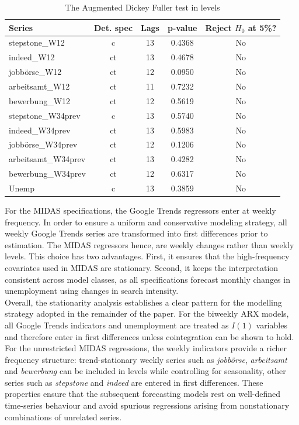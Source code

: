 \documentclass[12pt,a4paper]{article}
\begin{document}
\begin{table}
\label{tab:adf_levels}
\caption{The Augmented Dickey Fuller test in levels}
\begin{tabular}{lcccc}
\hline\hline
Series & Det. spec & Lags & p-value & Reject $H_0$ at 5\%? \\
\hline
stepstone\_W12      & c  & 13 &  0.4368 & No \\
indeed\_W12         & ct & 13 &  0.4678 & No \\
jobbörse\_W12       & ct & 12 &  0.0950 & No \\
arbeitsamt\_W12     & ct & 11 &  0.7232 & No \\
bewerbung\_W12      & ct & 12 &  0.5619 & No \\
stepstone\_W34prev  & c  & 13 &  0.5740 & No \\
indeed\_W34prev     & ct & 13 &  0.5983 & No \\
jobbörse\_W34prev   & ct & 12 &  0.1206 & No \\
arbeitsamt\_W34prev & ct & 13 &  0.4282 & No \\
bewerbung\_W34prev  & ct & 12 &  0.6317 & No \\
Unemp               & c  & 13 &  0.3859 & No \\
\hline\hline
\end{tabular}
\end{table}
For the MIDAS specifications, the Google Trends regressors enter at weekly frequency.
In order to ensure a uniform and conservative modeling strategy, all weekly
Google Trends series are transformed into first differences prior to estimation. 
The MIDAS regressors hence, are weekly changes rather than weekly levels. This choice has two advantages. First, it ensures that the high-frequency
covariates used in MIDAS are stationary. Second,
it keeps the interpretation consistent across model classes, as all specifications forecast
monthly changes in unemployment using changes in search intensity.\\
Overall, the stationarity analysis establishes a clear pattern for the modelling strategy adopted in the remainder of the paper. For the biweekly ARX models, all Google Trends indicators and unemployment are treated as $I(1)$ variables and therefore enter in first differences unless cointegration can be shown to hold. For the unrestricted MIDAS regressions, the weekly indicators provide a richer frequency structure: trend-stationary weekly series such as \textit{jobbörse}, \textit{arbeitsamt} and \textit{bewerbung} can be included in levels while controlling for seasonality, other series such as \textit{stepstone} and \textit{indeed} are entered in first differences. These properties ensure that the subsequent forecasting models rest on well-defined time-series behaviour and avoid spurious regressions arising from nonstationary combinations of unrelated series.
\end{document}
